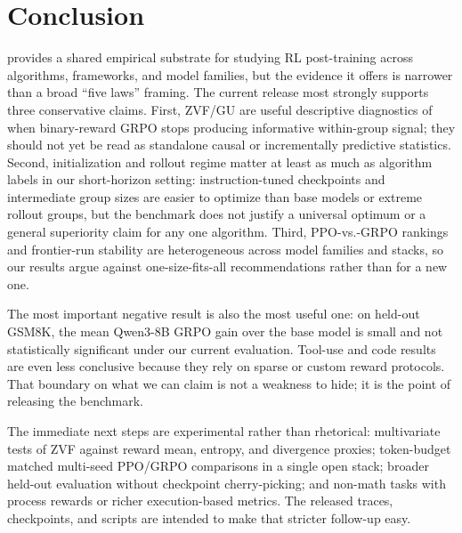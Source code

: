 \section{Conclusion}
\label{sec:conclusion}

\ours{} provides a shared empirical substrate for studying RL post-training
across algorithms, frameworks, and model families, but the evidence it offers
is narrower than a broad ``five laws'' framing. The current release most
strongly supports three conservative claims. First, ZVF/GU are useful
descriptive diagnostics of when binary-reward GRPO stops producing informative
within-group signal; they should not yet be read as standalone causal or
incrementally predictive statistics. Second, initialization and rollout regime
matter at least as much as algorithm labels in our short-horizon setting:
instruction-tuned checkpoints and intermediate group sizes are easier to
optimize than base models or extreme rollout groups, but the benchmark does
not justify a universal optimum or a general superiority claim for any one
algorithm. Third, PPO-vs.-GRPO rankings and frontier-run stability are
heterogeneous across model families and stacks, so our results argue against
one-size-fits-all recommendations rather than for a new one.

The most important negative result is also the most useful one: on held-out
GSM8K, the mean Qwen3-8B GRPO gain over the base model is small and not
statistically significant under our current evaluation. Tool-use and code
results are even less conclusive because they rely on sparse or custom reward
protocols. That boundary on what we can claim is not a weakness to hide; it is
the point of releasing the benchmark.

The immediate next steps are experimental rather than rhetorical: multivariate
tests of ZVF against reward mean, entropy, and divergence proxies; token-budget
matched multi-seed PPO/GRPO comparisons in a single open stack; broader
held-out evaluation without checkpoint cherry-picking; and non-math tasks with
process rewards or richer execution-based metrics. The released traces,
checkpoints, and scripts are intended to make that stricter follow-up easy.
